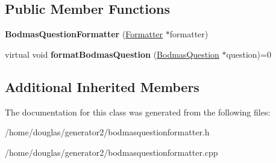 \subsection*{Public Member Functions}
\begin{DoxyCompactItemize}
\item 
{\bfseries Bodmas\+Question\+Formatter} (\hyperlink{classFormatter}{Formatter} $\ast$formatter)\hypertarget{classBodmasQuestionFormatter_a0c553ffeb33cdeb5a365840c5e8958e2}{}\label{classBodmasQuestionFormatter_a0c553ffeb33cdeb5a365840c5e8958e2}

\item 
virtual void {\bfseries format\+Bodmas\+Question} (\hyperlink{classBodmasQuestion}{Bodmas\+Question} $\ast$question)=0\hypertarget{classBodmasQuestionFormatter_afe7a1894127f1a2ff015caadfbfa3179}{}\label{classBodmasQuestionFormatter_afe7a1894127f1a2ff015caadfbfa3179}

\end{DoxyCompactItemize}
\subsection*{Additional Inherited Members}


The documentation for this class was generated from the following files\+:\begin{DoxyCompactItemize}
\item 
/home/douglas/generator2/bodmasquestionformatter.\+h\item 
/home/douglas/generator2/bodmasquestionformatter.\+cpp\end{DoxyCompactItemize}
